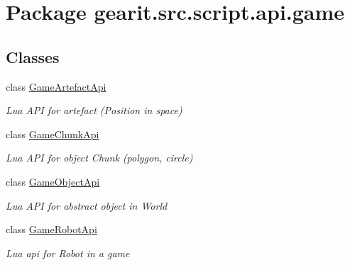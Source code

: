 \hypertarget{namespacegearit_1_1src_1_1script_1_1api_1_1game}{\section{Package gearit.\+src.\+script.\+api.\+game}
\label{namespacegearit_1_1src_1_1script_1_1api_1_1game}
}
\subsection*{Classes}
\begin{DoxyCompactItemize}
\item 
class \hyperlink{classgearit_1_1src_1_1script_1_1api_1_1game_1_1_game_artefact_api}{Game\+Artefact\+Api}
\begin{DoxyCompactList}\small\item\em Lua A\+P\+I for artefact (Position in space) \end{DoxyCompactList}\item 
class \hyperlink{classgearit_1_1src_1_1script_1_1api_1_1game_1_1_game_chunk_api}{Game\+Chunk\+Api}
\begin{DoxyCompactList}\small\item\em Lua A\+P\+I for object Chunk (polygon, circle) \end{DoxyCompactList}\item 
class \hyperlink{classgearit_1_1src_1_1script_1_1api_1_1game_1_1_game_object_api}{Game\+Object\+Api}
\begin{DoxyCompactList}\small\item\em Lua A\+P\+I for abstract object in World \end{DoxyCompactList}\item 
class \hyperlink{classgearit_1_1src_1_1script_1_1api_1_1game_1_1_game_robot_api}{Game\+Robot\+Api}
\begin{DoxyCompactList}\small\item\em Lua api for Robot in a game \end{DoxyCompactList}\end{DoxyCompactItemize}
